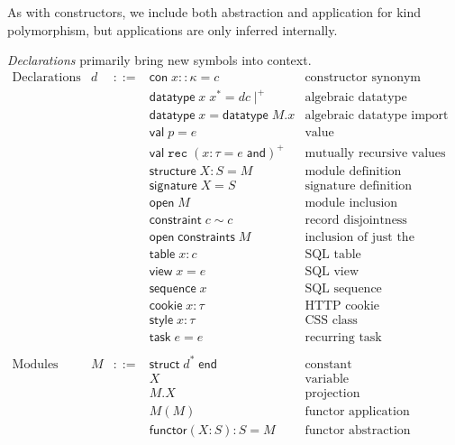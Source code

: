 \documentclass{article}
\newcommand{\cd}[1]{\texttt{#1}}
\newcommand{\mt}[1]{\mathsf{#1}}
\begin{document}
As with constructors, we include both abstraction and application for kind polymorphism, but applications are only inferred internally.

\emph{Declarations} primarily bring new symbols into context.
$$\begin{array}{rrcll}
  \textrm{Declarations} & d &::=& \mt{con} \; x :: \kappa = c & \textrm{constructor synonym} \\
  &&& \mt{datatype} \; x \; x^* = dc\mid^+ & \textrm{algebraic datatype definition} \\
  &&& \mt{datatype} \; x = \mt{datatype} \; M.x & \textrm{algebraic datatype import} \\
  &&& \mt{val} \; p = e & \textrm{value} \\
  &&& \mt{val} \; \cd{rec} \; (x : \tau = e \; \mt{and})^+ & \textrm{mutually recursive values} \\
  &&& \mt{structure} \; X : S = M & \textrm{module definition} \\
  &&& \mt{signature} \; X = S & \textrm{signature definition} \\
  &&& \mt{open} \; M & \textrm{module inclusion} \\
  &&& \mt{constraint} \; c \sim c & \textrm{record disjointness constraint} \\
  &&& \mt{open} \; \mt{constraints} \; M & \textrm{inclusion of just the constraints from a module} \\
  &&& \mt{table} \; x : c & \textrm{SQL table} \\
  &&& \mt{view} \; x = e & \textrm{SQL view} \\
  &&& \mt{sequence} \; x & \textrm{SQL sequence} \\
  &&& \mt{cookie} \; x : \tau & \textrm{HTTP cookie} \\
  &&& \mt{style} \; x : \tau & \textrm{CSS class} \\
  &&& \mt{task} \; e = e & \textrm{recurring task} \\
  \\
  \textrm{Modules} & M &::=& \mt{struct} \; d^* \; \mt{end} & \textrm{constant} \\
  &&& X & \textrm{variable} \\
  &&& M.X & \textrm{projection} \\
  &&& M(M) & \textrm{functor application} \\
  &&& \mt{functor}(X : S) : S = M & \textrm{functor abstraction} \\
\end{array}$$
\end{document}

